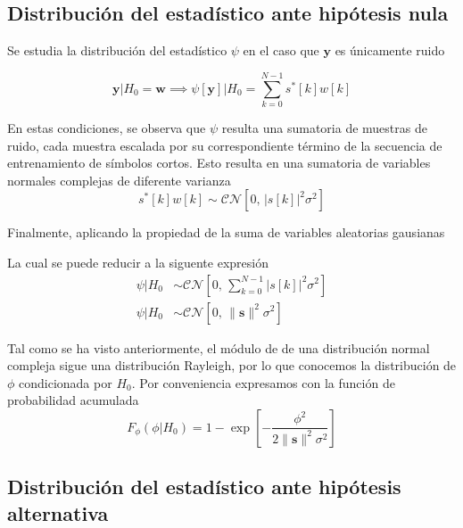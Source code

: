 \subsection{Distribución del estadístico ante hipótesis nula}

Se estudia la distribución del estadístico $\psi$ en el caso que $\mathbf{y}$ es únicamente ruido

\begin{equation}\label{eq:psi-ante-h0}
    \mathbf{y} | H_0 = \mathbf{w} \implies \psi[\mathbf{y}] | H_0= \sum_{k = 0}^{N-1} s^\ast[k]w[k]
\end{equation}

En estas condiciones, se observa que $\psi$ resulta una sumatoria de muestras de ruido, cada muestra escalada por su correspondiente término de la secuencia de entrenamiento de símbolos cortos. Esto resulta en una sumatoria de variables normales complejas de diferente varianza
\begin{equation}
    s^\ast[k]w[k] \sim \mathcal{CN}[0,\, \lvert s[k]\rvert^2\sigma^2]
\end{equation}

Finalmente, aplicando la propiedad de la suma de variables aleatorias gausianas

La cual se puede reducir a la siguente expresión
\begin{equation}
    \begin{aligned}
        \psi | H_0 &\sim \mathcal{CN}\left[0,\, \sum_{k=0}^{N-1} \lvert s[k]\rvert^2  \sigma^2 \right]\\[0.5em]
        \psi | H_0 &\sim \mathcal{CN}\left[0,\,\lVert \mathbf{s}\rVert^2  \sigma^2 \right] 
    \end{aligned}
\end{equation}

Tal como se ha visto anteriormente, el módulo de de una distribución normal compleja sigue una distribución Rayleigh, por lo que conocemos la distribución de $\phi$ condicionada por $H_0$. Por conveniencia expresamos con la función de probabilidad acumulada
\begin{equation}\label{eq:phi-ante-h0}
    F_\phi(\phi|H_0) = 1- \exp\left[-\frac{\phi^2}{2\lVert\mathbf{s}\rVert^2 \sigma^2}\right]    
\end{equation}


\subsection{Distribución del estadístico ante hipótesis alternativa}

